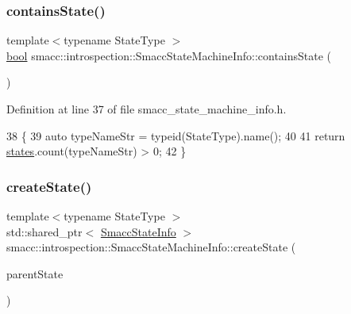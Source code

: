 \subsubsection{\texorpdfstring{contains\+State()}{containsState()}}
{\footnotesize\ttfamily template$<$typename State\+Type $>$ \\
\hyperlink{classbool}{bool} smacc\+::introspection\+::\+Smacc\+State\+Machine\+Info\+::contains\+State (\begin{DoxyParamCaption}{ }\end{DoxyParamCaption})\hspace{0.3cm}{\ttfamily [inline]}}



Definition at line 37 of file smacc\+\_\+state\+\_\+machine\+\_\+info.\+h.


\begin{DoxyCode}
38     \{
39         \textcolor{keyword}{auto} typeNameStr = \textcolor{keyword}{typeid}(StateType).name();
40 
41         \textcolor{keywordflow}{return} \hyperlink{classsmacc_1_1introspection_1_1SmaccStateMachineInfo_aef31d74ad3669f0b0f57fe0e008cd2f8}{states}.count(typeNameStr) > 0;
42     \}
\end{DoxyCode}
\mbox{\label{classsmacc_1_1introspection_1_1SmaccStateMachineInfo_ad3eacdb32594e603fb36a8ab478d0ce7}} 
\subsubsection{\texorpdfstring{create\+State()}{createState()}}
{\footnotesize\ttfamily template$<$typename State\+Type $>$ \\
std\+::shared\+\_\+ptr$<$ \hyperlink{classsmacc_1_1introspection_1_1SmaccStateInfo}{Smacc\+State\+Info} $>$ smacc\+::introspection\+::\+Smacc\+State\+Machine\+Info\+::create\+State (\begin{DoxyParamCaption}\item[{std\+::shared\+\_\+ptr$<$ \hyperlink{classsmacc_1_1introspection_1_1SmaccStateInfo}{Smacc\+State\+Info} $>$}]{parent\+State }\end{DoxyParamCaption})}



